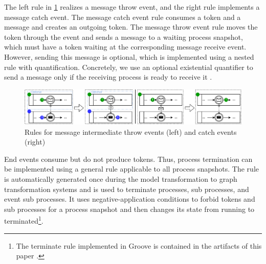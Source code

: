 \documentclass[submission, copyright, creativecommons]{eptcs}
\begin{document}
The left rule in \cref{fig:messageEventRules} realizes a message throw event, and the right rule implements a message catch event.
The message catch event rule consumes a token and a message and creates an outgoing token.
The message throw event rule moves the token through the event and sends a message to a waiting process snapshot, which must have a token waiting at the corresponding message receive event.
However, sending this message is optional, which is implemented using a nested rule with quantification.
Concretely, we use an optional existential quantifier to send a message only if the receiving process is ready to receive it \cite{rensinkNestedQuantificationGraph2006}.

\begin{figure}[h]
    \centering
    \includegraphics[width=1\textwidth]{images/bpmn_semantics-message-events.pdf}
    \caption{Rules for message intermediate throw events (left) and catch events (right)}
    \label{fig:messageEventRules}
\end{figure}

End events consume but do not produce tokens.
Thus, process termination can be implemented using a general rule applicable to all process snapshots.
The rule is automatically generated once during the model transformation to graph transformation systems and is used to terminate processes, sub processes, and event sub processes.
It uses negative-application conditions to forbid tokens and sub processes for a process snapshot and then changes its state from running to terminated\footnote{The terminate rule implemented in Groove is contained in the artifacts of this paper \cite{timkrauterArtifactsTERMGRAPH2022}.}.

\end{document}
